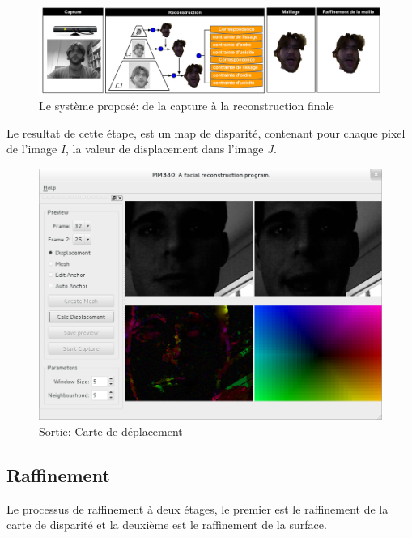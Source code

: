 \documentclass[a4paper,12pt]{article}
\begin{document}
\begin{figure}[ht!]
  \begin{center}
    \includegraphics[scale=0.35]{img/projSystem.png}
    \caption{Le système proposé: de la capture à la reconstruction finale}
  \end{center}
\end{figure}

Le resultat de cette étape, est un map de disparité, contenant pour
chaque pixel de l'image $I$, la valeur de displacement dans l'image
$J$. 

\begin{figure}[ht!]
  \begin{center}
    \includegraphics[scale=0.4]{img/dispMap.png}
    \caption{Sortie: Carte de déplacement}
  \end{center}
\end{figure}



\subsection{Raffinement}

Le processus de raffinement à deux étages, le premier est le
raffinement de la carte de disparité et la deuxième est le raffinement
de la surface.  
\end{document}

